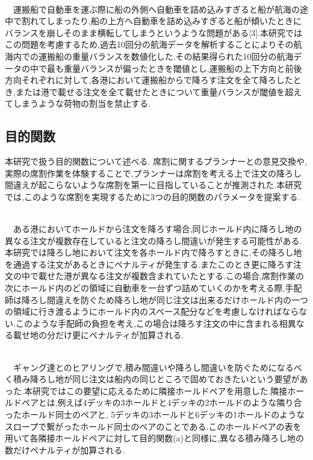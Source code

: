 \documentclass[a4j,11pt,twocolumn]{jsarticle}
\begin{document}
 \\
　運搬船で自動車を運ぶ際に船の外側へ自動車を詰め込みすぎると船が航海の途中で割れてしまったり,船の上方へ自動車を詰め込みすぎると船が傾いたときにバランスを崩しそのまま横転してしまうというような問題がある[3].本研究ではこの問題を考慮するため,過去10回分の航海データを解析することによりその航海内での運搬船の重量バランスを数値化した.その結果得られた10回分の航海データの中で最も重量バランスが偏ったときを閾値とし,運搬船の上下方向と前後方向それぞれに対して,各港において運搬船からで降ろす注文を全て降ろしたとき,または港で載せる注文を全て載せたときについて重量バランスが閾値を超えてしまうような荷物の割当を禁止する.


\subsection{目的関数}
本研究で扱う目的関数について述べる. 席割に関するプランナーとの意見交換や,実際の席割作業を体験することで,プランナーは席割を考える上で注文の降ろし間違えが起こらないような席割を第一に目指していることが推測された.本研究では,このような席割を実現するために3つの目的関数のパラメータを提案する.

 \\
　ある港においてホールドから注文を降ろす場合,同じホールド内に降ろし地の異なる注文が複数存在していると注文の降ろし間違いが発生する可能性がある. 本研究では降ろし地において注文を各ホールド内で降ろすときに,その降ろし地を通過する注文があるときにペナルティが発生する.またこのとき更に降ろす注文の中で載せた港が異なる注文が複数含まれていたとする.この場合,席割作業の次にホールド内のどの領域に自動車を一台ずつ詰めていくのかを考える際,手配師は降ろし間違えを防ぐため降ろし地が同じ注文は出来るだけホールド内の一つの領域に行き渡るようにホールド内のスペース配分などを考慮しなければならない.このような手配師の負担を考え,この場合は降ろす注文の中に含まれる相異なる載せ地の分だけ更にペナルティが加算される.

 \\
　ギャング達とのヒアリングで,積み間違いや降ろし間違いを防ぐためになるべく積み降ろし地が同じ注文は船内の同じところで固めておきたいという要望があった.本研究ではこの要望に応えるために隣接ホールドペアを用意した.隣接ホールドペアとは,例えば4デッキの3ホールドと4デッキの2ホールドのような隣り合ったホールド同士のペアと, 5デッキの3ホールドと6デッキの1ホールドのようなスロープで繋がったホールド同士のペアのことである.このホールドペアの表を用いて各隣接ホールドペアに対して目的関数(a)と同様に,異なる積み降ろし地の数だけペナルティが加算される.
\end{document}
